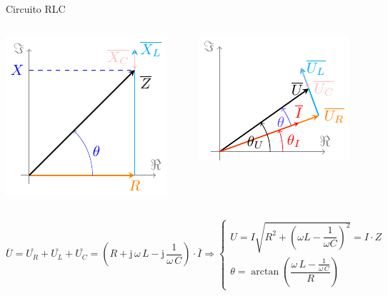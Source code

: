 \documentclass[aspectratio=169, xcolor={usenames,svgnames,dvipsnames}]{beamer}
\begin{document}
\begin{frame}{Circuito RLC}
\begin{columns}
\begin{column}{0.5\columnwidth}
\begin{center}
\includegraphics[width=0.6\linewidth]{../figs/fasorRLC.pdf}
\end{center}
\end{column}
\begin{column}{0.5\columnwidth}
\begin{center}
\includegraphics[width=0.6\linewidth]{../figs/fasorRLC_VI.pdf}
\end{center}
\end{column}
\end{columns}

\begin{center}
\begin{equation*}
		\overline{U} = \overline{U_R} +\overline{U_L} + \overline{U_C} =\left(R+\mathrm{j}\,\omega\,L - \mathrm{j}\,\dfrac{1}{\omega\,C}\right) \cdot \overline{I}\Rightarrow 
		\begin{cases}
			U=I\sqrt{R^2 + \left(\omega L - \dfrac{1}{\omega C}\right)^2}=I\cdot Z\\
			\theta=\arctan\left( \dfrac{\omega\,L-\frac{1}{\omega\,C}}{R}\right)
		\end{cases}
	\end{equation*}
\end{center}
\end{frame}
\end{document}
